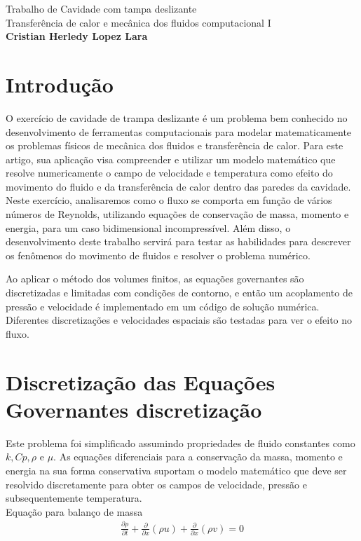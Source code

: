 \documentclass[]{article}
\title{}
\author{}
\begin{document}
	
\begin{center}
	{\tiny {\normalsize {\large Trabalho de Cavidade com tampa deslizante\\
				Transferência de calor e mecânica dos fluidos computacional I\\
				\textbf{Cristian Herledy Lopez Lara}}}}
\end{center}


\section*{Introdução}
O exercício de cavidade de trampa deslizante é um problema bem conhecido no desenvolvimento de ferramentas computacionais para modelar matematicamente os problemas físicos de mecânica dos fluidos e transferência de calor. Para este artigo, sua aplicação visa compreender e utilizar um modelo matemático que resolve numericamente o campo de velocidade e temperatura como efeito do movimento do fluido e da transferência de calor dentro das paredes da cavidade. Neste exercício, analisaremos como o fluxo se comporta em função de vários números de Reynolds, utilizando equações de conservação de massa, momento e energia, para um caso bidimensional incompressível. Além disso, o desenvolvimento deste trabalho servirá para testar as habilidades para descrever os fenômenos do movimento de fluidos e resolver o problema numérico.

Ao aplicar o método dos volumes finitos, as equações governantes são discretizadas e limitadas com condições de contorno, e então um acoplamento de pressão e velocidade é implementado em um código de solução numérica. Diferentes discretizações e velocidades espaciais são testadas para ver o efeito no fluxo.

\section*{Discretização das Equações Governantes discretização}

Este problema foi simplificado assumindo propriedades de fluido constantes como $k, Cp, \rho$ e $\mu$. As equações diferenciais para a conservação da massa, momento e energia na sua forma conservativa suportam o modelo matemático que deve ser resolvido discretamente para obter os campos de velocidade, pressão e subsequentemente temperatura.\\
	
Equação para balanço de massa
\begin{equation}
	\begin{aligned}
		\frac{\partial \rho}{\partial t} + \frac{\partial}{\partial x}(\rho u) + \frac{\partial}{\partial x}(\rho v) = 0
	\end{aligned}
	\label{eq:1}	
\end{equation}\\
\end{document}
